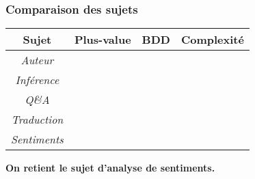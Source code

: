 \begin{frame}
	\frametitle{Comparaison des sujets}
	\begin{table}[ht]
		\centering
		\begin{tabular}{cccc}
			\toprule
			\textbf{Sujet} & \textbf{Plus-value} & \textbf{BDD} & \textbf{Complexité} \\
			\midrule
			\rule{0pt}{13pt}\textit{Auteur} & \neutral & \plus & \neutral \\
			\rule{0pt}{13pt}\textit{Inférence} & \neutral & \plus & \moins \\
			\rule{0pt}{13pt}\textit{Q\&A} & \neutral & \neutral & \moins \\
			\rule{0pt}{13pt}\textit{Traduction} & \moins & \plus & \moins \\
			\rule{0pt}{13pt}\textit{Sentiments} & \plus & \plus & \neutral \\
			\bottomrule
		\end{tabular}
	\end{table}

	\begin{center}
		\textbf{On retient le sujet d'analyse de sentiments.}
	\end{center}
\end{frame}